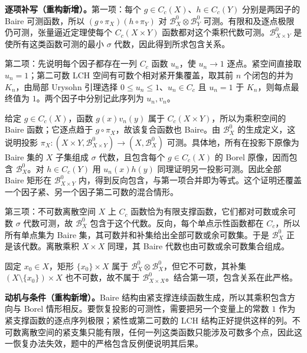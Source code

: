 \documentclass[../../main.tex]{subfiles}
\begin{document}
\begin{solution}
\textbf{逐项补写（重构新增）。}第一项：每个 $g\in C_c(X)$、$h\in C_c(Y)$ 分别是两因子的 Baire 可测函数，所以 $(g\circ\pi_X)(h\circ\pi_Y)$ 对 $\mathscr B_X^0\otimes\mathscr B_Y^0$ 可测。有限和及逐点极限仍可测，张量逼近定理使每个 $C_c(X\times Y)$ 函数都对这个乘积代数可测。$\mathscr B_{X\times Y}^0$ 是使所有这类函数可测的最小 $\sigma$ 代数，因此得到所求包含关系。

第二项：先说明每个因子都存在一列 $C_c$ 函数 $u_n$，使 $u_n\to1$ 逐点。紧空间直接取 $u_n=1$；第二可数 LCH 空间有可数个相对紧开集覆盖，取其前 $n$ 个闭包的并为 $K_n$，由局部 Urysohn 引理选择 $0\leqslant u_n\leqslant1$、$u_n\in C_c$ 且 $u_n=1$ 于 $K_n$，则每点最终值为 $1$。两个因子中分别记此序列为 $u_n,v_n$。

给定 $g\in C_c(X)$，函数 $g(x)v_n(y)$ 属于 $C_c(X\times Y)$，所以为乘积空间的 Baire 函数；它逐点趋于 $g\circ\pi_X$，故该复合函数也 Baire。由 $\mathscr B_X^0$ 的生成定义，这说明投影 $\pi_X:(X\times Y,\mathscr B_{X\times Y}^0)\to(X,\mathscr B_X^0)$ 可测。具体地，所有在投影下原像为 Baire 集的 $X$ 子集组成 $\sigma$ 代数，且包含每个 $g\in C_c(X)$ 的 Borel 原像，因而包含 $\mathscr B_X^0$。对 $h\in C_c(Y)$ 用 $u_n(x)h(y)$ 同理证明另一投影可测。因此全部 Baire 矩形在 $\mathscr B_{X\times Y}^0$ 内，得到反向包含，与第一项合并即为等式。这个证明还覆盖一个因子紧、另一个因子第二可数的混合情形。

第三项：不可数离散空间 $X$ 上 $C_c$ 函数恰为有限支撑函数，它们都对可数或余可数 $\sigma$ 代数可测，故 $\mathscr B_X^0$ 包含于这个代数。反向，每个单点示性函数都在 $C_c$，所以所有单点集为 Baire 集，其可数并和补集给出全部可数或余可数集。于是 $\mathscr B_X^0$ 正是该代数。离散乘积 $X\times X$ 同理，其 Baire 代数也由可数或余可数集合组成。

固定 $x_0\in X$，矩形 $\{x_0\}\times X$ 属于 $\mathscr B_X^0\otimes\mathscr B_X^0$，但它不可数，其补集 $(X\setminus\{x_0\})\times X$ 也不可数，故不属于 $\mathscr B_{X\times X}^0$。结合第一项，包含关系在此严格。
\end{solution}
\begin{remark}
\textbf{动机与条件（重构新增）。}Baire 结构由紧支撑连续函数生成，所以其乘积包含方向与 Borel 情形相反。要恢复投影的可测性，需要把另一个变量上的常数 $1$ 作为紧支撑函数的逐点序列极限；紧性或第二可数的 LCH 结构正好提供这样的列。不可数离散空间的紧支集只能有限，任何一列这类函数只能涉及可数多个点，因此这一恢复办法失效，题中的严格包含反例便说明其后果。
\end{remark}
\end{document}
